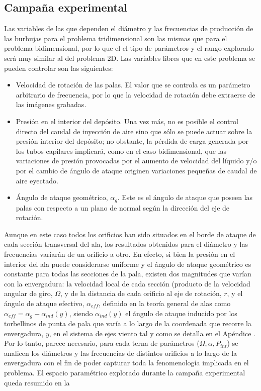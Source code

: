 \subsection{Campaña experimental}

Las variables de las que dependen el diámetro y las frecuencias de producción de las burbujas para el problema tridimensional son las mismas que para el problema bidimensional, por lo que el el tipo de parámetros y el rango explorado será muy similar al del problema 2D. Las variables libres que en este problema se pueden controlar son las siguientes:

\begin{itemize}
\item Velocidad de rotación de las palas. El valor que se controla es un parámetro arbitrario de frecuencia, por lo que la velocidad de rotación debe extraerse de las imágenes grabadas.
\item Presión en el interior del depósito. Una vez más, no es posible el control directo del caudal de inyección de aire sino que sólo se puede actuar sobre la presión interior del depósito; no obstante, la pérdida de carga generada por los tubos capilares implicará, como en el caso bidimensional, que las variaciones de presión provocadas por el aumento de velocidad del líquido y/o por el cambio de ángulo de ataque originen variaciones pequeñas de caudal de aire eyectado.
\item Ángulo de ataque geométrico, $\alpha_{g}$. Este es el ángulo de ataque que poseen las palas con respecto a un plano de normal según la dirección del eje de rotación. 
\end{itemize}

Aunque en este caso todos los orificios han sido situados en el borde de ataque de cada sección transversal del ala, los resultados obtenidos para el diámetro y las frecuencias variarán de un orificio a otro. En efecto, si bien la presión en el interior del ala puede considerarse uniforme y el ángulo de ataque geométrico es constante para todas las secciones de la pala, existen dos magnitudes que varían con la envergadura: la velocidad local de cada sección (producto de la velocidad angular de giro, $\Omega$, y de la distancia de cada orificio al  eje de rotación, $r$, y el ángulo de ataque efectivo, $\alpha_{eff}$, definido en la teoría general de alas como $\alpha_{eff} = \alpha_{g} - \alpha_{ind}\left(y\right)$, siendo $\alpha_{ind}\left(y\right)$ el ángulo de ataque inducido por los torbellinos de punta de pala que varía a lo largo de la coordenada que recorre la envergadura, $y$, en el sistema de ejes viento tal y como se detalla en el Apéndice %
. Por lo tanto, parece necesario, para cada terna de parámetros ($\Omega, \alpha, P_{int}$) se analicen los diámetros y las frecuencias de distintos orificios a lo largo de la envergadura con el fin de poder capturar toda la fenomenología implicada en el problema. El espacio paramétrico explorado durante la campaña experimental queda resumido en la 


